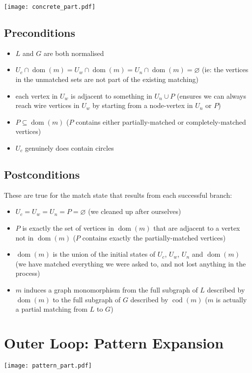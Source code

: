 \documentclass{article}
\DeclareMathOperator{\dom}{dom}
\DeclareMathOperator{\codom}{cod}
\begin{document}
\begin{center}
    \texttt{[image: concrete\_part.pdf]}
\end{center}

\subsection{Preconditions}
\begin{itemize}
\item $L$ and $G$ are both normalised
\item $U_c\cap\dom(m) = U_w\cap\dom(m) = U_n\cap\dom(m) = \varnothing$ (ie: the vertices in the unmatched sets are not part of the existing matching)
\item each vertex in $U_w$ is adjacent to something in $U_n\cup P$ (ensures we can always reach wire vertices in $U_w$ by starting from a node-vertex in $U_n$ or $P$)
\item $P \subseteq \dom(m)$ ($P$ contains either partially-matched or completely-matched vertices)
\item $U_c$ genuinely does contain circles
\end{itemize}

\subsection{Postconditions}
These are true for the match state that results from each successful branch:
\begin{itemize}
\item $U_c = U_w = U_n = P = \varnothing$ (we cleaned up after ourselves)
\item $P$ is exactly the set of vertices in $\dom(m)$ that are adjacent to a vertex not in $\dom(m)$ ($P$ contains exactly the partially-matched vertices)
\item $\dom(m)$ is the union of the initial states of $U_c$, $U_w$, $U_n$ and $\dom(m)$ (we have matched everything we were asked to, and not lost anything in the process)
\item $m$ induces a graph monomorphism from the full subgraph of $L$ described by $\dom(m)$ to the full subgraph of $G$ described by $\codom(m)$ ($m$ is actually a partial matching from $L$ to $G$)
\end{itemize}

\section{Outer Loop: Pattern Expansion}

\begin{center}
    \texttt{[image: pattern\_part.pdf]}
\end{center}
\end{document}
